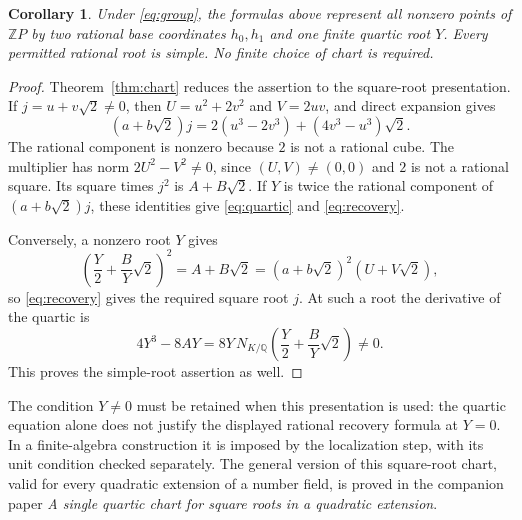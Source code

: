 \documentclass[11pt,a4paper]{article}
\newtheorem{corollary}[theorem]{Corollary}
\newcommand{\Q}{\mathbb Q}\newcommand{\Z}{\mathbb Z}
\begin{document}
\begin{corollary}\label{cor:single-chart}
Under \eqref{eq:group}, the formulas above represent all nonzero
points of $\Z P$ by two rational base coordinates $h_0,h_1$
and one finite quartic root $Y$. Every permitted rational root
is simple. No finite choice of chart is required.
\end{corollary}
\begin{proof}
Theorem~\ref{thm:chart} reduces the assertion to the square-root
presentation. If $j=u+v\sqrt2\ne0$, then
$U=u^2+2v^2$ and $V=2uv$, and direct expansion gives
\[
 (a+b\sqrt2)j
       =2(u^3-2v^3)+(4v^3-u^3)\sqrt2.
\]
The rational component is nonzero because $2$ is not a rational
cube. The multiplier has norm $2U^2-V^2\ne0$, since $(U,V)\ne(0,0)$
and $2$ is not a rational square. Its square times $j^2$ is
$A+B\sqrt2$. If $Y$ is twice the rational component of
$(a+b\sqrt2)j$, these identities give \eqref{eq:quartic} and
\eqref{eq:recovery}.

Conversely, a nonzero root $Y$ gives
\[
 \left(\frac Y2+\frac BY\sqrt2\right)^2=A+B\sqrt2
                     =(a+b\sqrt2)^2(U+V\sqrt2),
\]
so \eqref{eq:recovery} gives the required square root $j$.
At such a root the derivative of the quartic is
\[
 4Y^3-8AY=8Y\,N_{K/\Q}\left(\frac Y2+\frac BY\sqrt2\right)\ne0.
\]
This proves the simple-root assertion as well.
\end{proof}

The condition $Y\ne0$ must be retained when this presentation
is used: the quartic equation alone does not justify the displayed
rational recovery formula at $Y=0$. In a finite-algebra
construction it is imposed by the localization step, with its
unit condition checked separately. The general version of this
square-root chart, valid for every quadratic extension of a number
field, is proved in the companion paper \emph{A single quartic
chart for square roots in a quadratic extension}.
\end{document}
